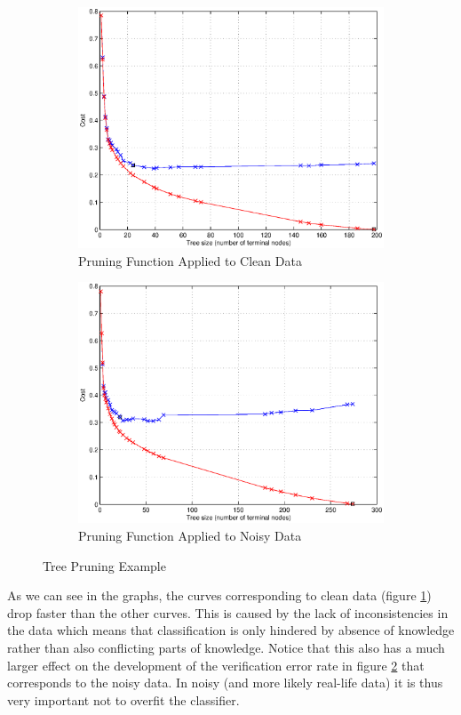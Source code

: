 \documentclass[11pt,a4paper]{article}
\begin{document}
\begin{figure}[!ht]
	\centering
	\begin{subfigure}[b]{0.495\textwidth}
		\includegraphics[width=\textwidth]{images/pruning_clean_data.eps}
     	\caption{Pruning Function Applied to Clean Data}
     	\label{fig:pruningClean}
    \end{subfigure}
	\begin{subfigure}[b]{0.495\textwidth}
		\includegraphics[width=\textwidth]{images/pruning_noisy_data.eps}
     	\caption{Pruning Function Applied to Noisy Data}
     	\label{fig:pruningNoisy}
    \end{subfigure}
    \caption{Tree Pruning Example}
    \label{fig:pruning}
\end{figure}

As we can see in the graphs, the curves corresponding to clean data (figure \ref{fig:pruningClean}) drop faster than the other curves. This is caused by the lack of inconsistencies in the data which means that classification is only hindered by absence of knowledge rather than also conflicting parts of knowledge. Notice that this also has a much larger effect on the development of the verification error rate in figure \ref{fig:pruningNoisy} that corresponds to the noisy data. In noisy (and more likely real-life data) it is thus very important not to overfit the classifier.
\end{document}
